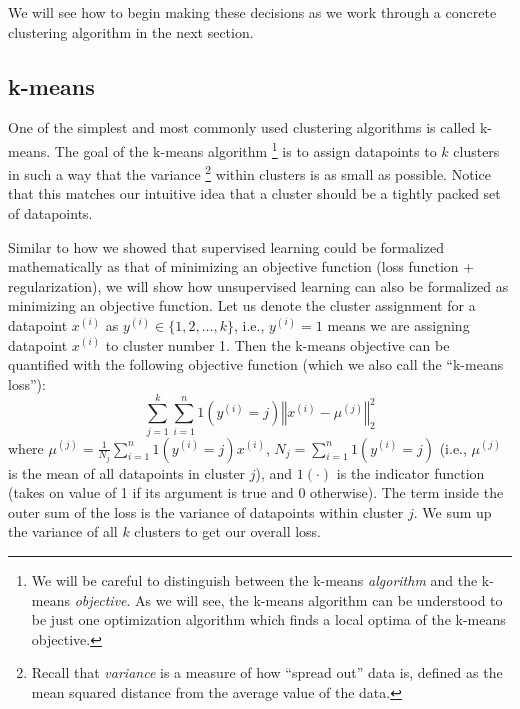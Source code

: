 \documentclass[11pt]{article}
\newcommand{\anchorednote}[2]{ #1 \note{#2} }	%
\newcommand{\note}[1]{\todo[color=blue!10,
  linecolor=blue!90,size=\small]{\linespread{0.9}\selectfont{#1}\par}}
\renewcommand{\note}[1]{\footnote{#1}}
\begin{document}
We will see how to begin making these decisions as we work through a concrete clustering algorithm in the next section.

\subsection{k-means}




One of the simplest and most commonly used clustering algorithms is called k-means. The goal of the k-means\anchorednote{algorithm}{We will be careful to distinguish between the k-means {\em algorithm} and the k-means {\em objective}. As we will see, the k-means algorithm can be understood to be just one optimization algorithm which finds a local optima of the k-means objective.} is to assign datapoints to $k$ clusters in such a way that the\anchorednote{variance}{Recall that \textit{variance} is a measure of how ``spread out'' data is, defined as the mean squared distance from the average value of the data.} within clusters is as small as possible. Notice that this matches our intuitive idea that a cluster should be a tightly packed set of datapoints.

Similar to how we showed that supervised learning could be formalized mathematically as that of minimizing an objective function (loss function + regularization), we will show how unsupervised learning can also be formalized as minimizing an objective function.
Let us denote the cluster assignment for a datapoint $x^{(i)}$ as $y^{(i)} \in \{1,2,\ldots,k\}$, i.e., $y^{(i)} = 1$ means we are assigning datapoint $x^{(i)}$ to cluster number 1. Then the k-means objective can be quantified with the following objective function (which we also call the ``k-means loss''):
\begin{equation}
    \sum_{j=1}^k \sum_{i=1}^n 1(y^{(i)} = j) \left\Vert x^{(i)} - \mu^{(j)} \right\Vert_2^2 \label{eqn:kmeans_obj}
\end{equation}
where $\mu^{(j)} = \frac{1}{N_j} \sum_{i=1}^n 1(y^{(i)} = j) x^{(i)}$, $N_j = \sum_{i=1}^n 1(y^{(i)} = j)$ (i.e., $\mu^{(j)}$ is the mean of all datapoints in cluster $j$), and $1(\cdot)$ is the indicator function (takes on value of 1 if its argument is true and 0 otherwise). The term inside the outer sum of the loss is the variance of datapoints within cluster $j$. We sum up the variance of all $k$ clusters to get our overall loss.
\end{document}
